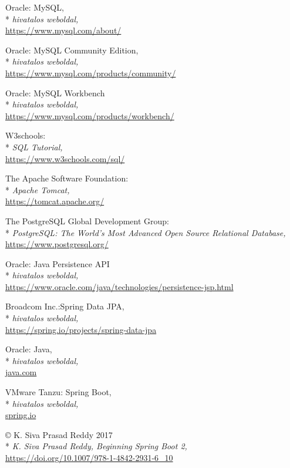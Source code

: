 \begin{thebibliography}{x}
 Oracle: MySQL,\\*
\textit{hivatalos weboldal,}
\\ \url{https://www.mysql.com/about/}

 Oracle: MySQL Community Edition,\\*
\textit{hivatalos weboldal,}
\\ \url{https://www.mysql.com/products/community/}

 Oracle: MySQL Workbench\\*
\textit{hivatalos weboldal,}
\\ \url{https://www.mysql.com/products/workbench/}

 W3schools:\\*
\textit{SQL Tutorial,}
\\ \url{https://www.w3schools.com/sql/}

 The Apache Software Foundation: \\*
\textit{Apache Tomcat,}
\\ \url{https://tomcat.apache.org/}

 The PostgreSQL Global Development Group:\\*
\textit{PostgreSQL: The World's Most Advanced Open Source Relational Database,}
\\ \url{https://www.postgresql.org/}

 Oracle: Java Persistence API\\*
\textit{hivatalos weboldal,}
\\ \url{https://www.oracle.com/java/technologies/persistence-jsp.html}

 Broadcom Inc.:Spring Data JPA,\\*
\textit{hivatalos weboldal,}
\\ \url{https://spring.io/projects/spring-data-jpa}

 Oracle: Java,\\*
\textit{hivatalos weboldal,}
\\ \url{java.com}

 VMware Tanzu: Spring Boot,\\*
\textit{hivatalos weboldal,}
\\ \url{spring.io}

 © K. Siva Prasad Reddy 2017\\*
\textit{K. Siva Prasad Reddy, Beginning Spring Boot 2,}
\\ \url{https://doi.org/10.1007/978-1-4842-2931-6_10}


\end{thebibliography}
